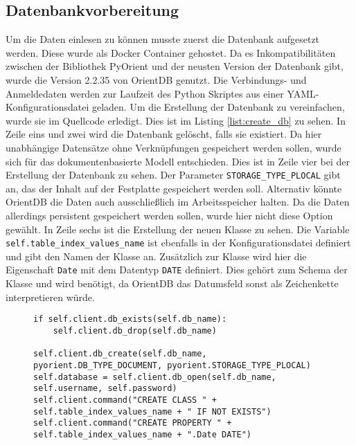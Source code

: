 
\subsection{Datenbankvorbereitung}

Um die Daten einlesen zu können musste zuerst die Datenbank aufgesetzt werden. Diese wurde als Docker Container gehostet. Da es Inkompatibilitäten zwischen der Bibliothek PyOrient und der neusten Version der Datenbank gibt, wurde die Version 2.2.35 von OrientDB genutzt. Die Verbindungs- und Anmeldedaten werden zur Laufzeit des Python Skriptes aus einer \gls{YAML}-Konfigurationsdatei geladen. Um die Erstellung der Datenbank zu vereinfachen, wurde sie im Quellcode erledigt. Dies ist im Listing \ref{list:create_db} zu sehen. In Zeile eins und zwei wird die Datenbank gelöscht, falls sie existiert. Da hier unabhängige Datensätze ohne Verknüpfungen gespeichert werden sollen, wurde sich für das dokumentenbasierte Modell entschieden. Dies ist in Zeile vier bei der Erstellung der Datenbank zu sehen. Der Parameter \texttt{STORAGE\_TYPE\_PLOCAL} gibt an, das der Inhalt auf der Festplatte gespeichert werden soll. Alternativ könnte OrientDB die Daten auch ausschließlich im Arbeitsspeicher halten. Da die Daten allerdings persistent gespeichert werden sollen, wurde hier nicht diese Option gewählt. In Zeile sechs ist die Erstellung der neuen Klasse zu sehen. Die Variable \texttt{self.table\_index\_values\_name} ist ebenfalls in der Konfigurationsdatei definiert und gibt den Namen der Klasse an. Zusätzlich zur Klasse wird hier die Eigenschaft \texttt{Date} mit dem Datentyp \texttt{DATE} definiert. Dies gehört zum Schema der Klasse und wird benötigt, da OrientDB das Datumsfeld sonst als Zeichenkette interpretieren würde.

\begin{figure}[!htb]
    \begin{lstlisting}[caption=Anlegen und initialiseren einer Datenbank in Python, label=list:create_db]
if self.client.db_exists(self.db_name):
    self.client.db_drop(self.db_name)

self.client.db_create(self.db_name, pyorient.DB_TYPE_DOCUMENT, pyorient.STORAGE_TYPE_PLOCAL)
self.database = self.client.db_open(self.db_name, self.username, self.password)
self.client.command("CREATE CLASS " + self.table_index_values_name + " IF NOT EXISTS")
self.client.command("CREATE PROPERTY " + self.table_index_values_name + ".Date DATE")
    \end{lstlisting}
\end{figure}

